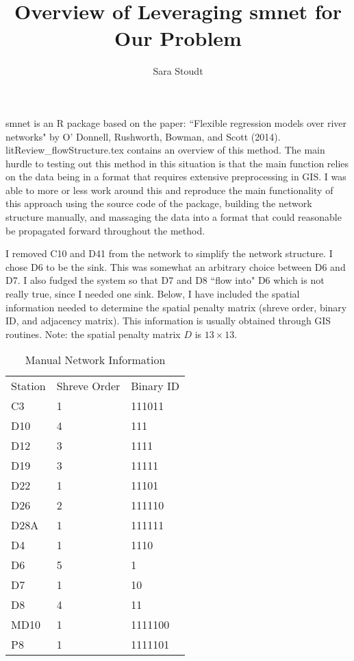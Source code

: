 \documentclass[12pt]{amsart}
\title{Overview of Leveraging smnet for Our Problem}
\author{Sara Stoudt}
\begin{document}
\maketitle

smnet is an R package based on the paper: ``Flexible regression models over river networks" by O' Donnell, Rushworth, Bowman, and Scott (2014). litReview\_flowStructure.tex contains an overview of this method. The main hurdle to testing out this method in this situation is that the main function relies on the data being in a format that requires extensive preprocessing in GIS. I was able to more or less work around this and reproduce the main functionality of this approach using the source code of the package, building the network structure manually, and massaging the data into a format that could reasonable be propagated forward throughout the method.

I removed C10 and D41 from the network to simplify the network structure. I chose D6 to be the sink. This was somewhat an arbitrary choice between D6 and D7. I also fudged the system so that D7 and D8 ``flow into" D6 which is not really true, since I needed one sink. Below, I have included the spatial information needed to determine the spatial penalty matrix (shreve order, binary ID, and adjacency matrix). This information is usually obtained through GIS routines. Note: the spatial penalty matrix $D$ is $13 \times 13$.

\begin{table}[H]
\centering
\begin{tabular}{lll}
Station & Shreve Order & Binary ID \\
C3      & 1            & 111011    \\
D10     & 4            & 111       \\
D12     & 3            & 1111      \\
D19     & 3            & 11111     \\
D22     & 1            & 11101     \\
D26     & 2            & 111110    \\
D28A    & 1            & 111111    \\
D4      & 1            & 1110      \\
D6      & 5            & 1         \\
D7      & 1            & 10        \\
D8      & 4            & 11        \\
MD10    & 1            & 1111100   \\
P8      & 1            & 1111101  
\end{tabular}
\caption{Manual Network Information}
\label{tab:networkInfo}
\end{table}
\end{document}
